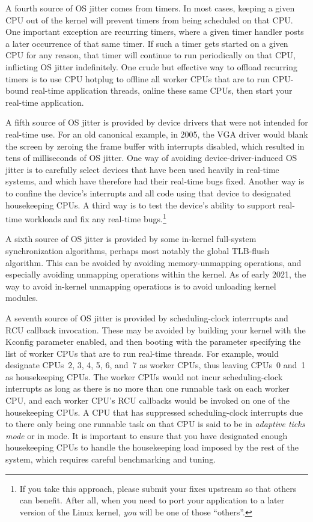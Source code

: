 A fourth source of OS jitter comes from timers.
In most cases, keeping a given CPU out of the kernel will prevent
timers from being scheduled on that CPU\@.
One important exception are recurring timers, where a given timer
handler posts a later occurrence of that same timer.
If such a timer gets started on a given CPU for any reason, that
timer will continue to run periodically on that CPU, inflicting
OS jitter indefinitely.
One crude but effective way to offload recurring timers is to
use CPU hotplug to offline all worker CPUs that are to run CPU-bound
real-time application threads, online these same CPUs, then start
your real-time application.

A fifth source of OS jitter is provided by device drivers that were
not intended for real-time use.
For an old canonical example, in 2005, the VGA driver would blank
the screen by zeroing the frame buffer with interrupts disabled,
which resulted in tens of milliseconds of OS jitter.
One way of avoiding device-driver-induced OS jitter is to carefully
select devices that have been used heavily in real-time systems,
and which have therefore had their real-time bugs fixed.
Another way is to confine the device's interrupts and all code using
that device to designated housekeeping CPUs.
A third way is to test the device's ability to support real-time
workloads and fix any real-time bugs.\footnote{
	If you take this approach, please submit your fixes upstream
	so that others can benefit.
	After all, when you need to port your application to
	a later version of the Linux kernel, \emph{you} will be one of those
	``others''.}

A sixth source of OS jitter is provided by some in-kernel
full-system synchronization algorithms, perhaps most notably
the global TLB-flush algorithm.
This can be avoided by avoiding memory-unmapping operations, and especially
avoiding unmapping operations within the kernel.
As of early 2021, the way to avoid in-kernel
unmapping operations is to avoid unloading kernel modules.

A seventh source of OS jitter is provided by
scheduling-clock interrrupts and RCU callback invocation.
These may be avoided by building your kernel with the
 Kconfig parameter enabled, and then booting
with the  parameter specifying the list of
worker CPUs that are to run real-time threads.
For example,  would designate CPUs~2, 3, 4, 5, 6, and~7
as worker CPUs, thus leaving CPUs~0 and~1 as housekeeping CPUs.
The worker CPUs would not incur scheduling-clock interrupts as long
as there is no more than one runnable task on each worker CPU,
and each worker CPU's RCU callbacks would be invoked on one of the
housekeeping CPUs.
A CPU that has suppressed scheduling-clock interrupts due to there
only being one runnable task on that CPU is said to be in
\emph{adaptive ticks mode} or in  mode.
It is important to ensure that you have designated enough
housekeeping CPUs to handle the housekeeping load imposed by the
rest of the system, which requires careful benchmarking and tuning.

